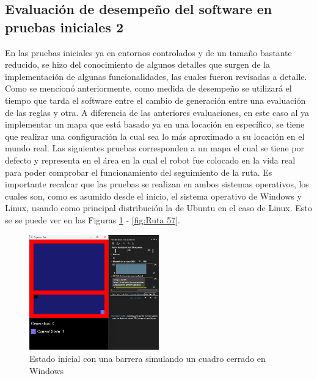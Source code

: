 \subsection{Evaluaci\'on de desempe\~no del software en pruebas iniciales 2}
    En las pruebas iniciales ya en entornos controlados y de un
        tama\~no bastante reducido, se hizo del conocimiento de
        algunos detalles que surgen de la implementaci\'on de algunas
        funcionalidades, las cuales fueron revisadas a detalle.
    \vskip 0.5cm
    Como se mencion\'o anteriormente, como medida de
        desempe\~no se utilizar\'a el tiempo que tarda el software entre
        el cambio de generaci\'on entre una evaluaci\'on de las reglas y
        otra. A diferencia de las anteriores evaluaciones, en este caso
        al ya implementar un mapa que est\'a basado ya en una
        locaci\'on en espec\'ifico, se tiene que realizar una
        configuraci\'on la cual sea lo m\'as aproximado a su locaci\'on
        en el mundo real.
    \vskip 0.5cm
    Las siguientes pruebas corresponden a un mapa el cual se
        tiene por defecto y representa en el \'area en la cual el robot
        fue colocado en la vida real para poder comprobar el
        funcionamiento del seguimiento de la ruta. Es importante
        recalcar que las pruebas se realizan en ambos sistemas
        operativos, los cuales son, como es asumido desde el inicio, 
        el sistema operativo de Windows y Linux, usando como
        principal distribuci\'on la de Ubuntu en el caso de Linux. Esto se
        se puede ver en las Figuras \ref{fig:Ruta 47} - \ref{fig:Ruta 57}.
    \vskip 0.5cm
    \begin{figure}[htbp]
        \centering
        \includegraphics[width=0.5\textwidth]{./images/Pruebas/simulador/image047.png}
        \caption{Estado inicial con una barrera simulando un cuadro cerrado en Windows}
        \label{fig:Ruta 47}
    \end{figure}
    \vskip 0.5cm
